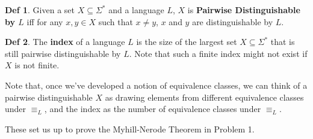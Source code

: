 \documentclass{exam}
\theoremstyle{definition}
\newtheorem*{definition}{Def}
\begin{document}
\begin{definition}
    Given a set $X \subseteq \Sigma^*$ and a language $L$, $X$ is \textbf{Pairwise Distinguishable by $L$} iff for any $x,y \in X$ such that $x \neq y$, $x$ and $y$ are distinguishable by $L$.
\end{definition}

\begin{definition}
    The \textbf{index} of a language $L$ is the size of the largest set $X \subseteq \Sigma^*$ that is still pairwise distinguishable by $L$. Note that such a finite index might not exist if $X$ is not finite.
\end{definition}

Note that, once we've developed a notion of equivalence classes, we can think of a pairwise distinguishable $X$ as drawing elements from different equivalence classes under $\equiv_L$, and the index as the number of equivalence classes under $\equiv_L$. 

These set us up to prove the Myhill-Nerode Theorem in Problem 1.
\end{document}
